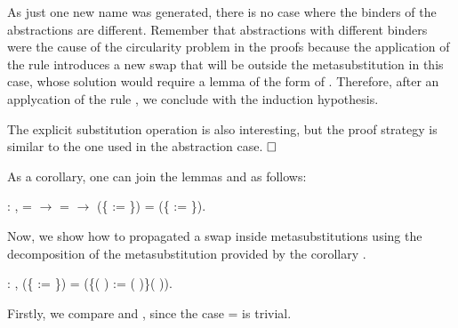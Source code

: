 As just one new name was generated, there is no case where the binders of the abstractions are different. Remember that abstractions with different binders were the cause of the circularity problem in the proofs because the application of the rule  introduces a new swap that will be outside the metasubstitution in this case, whose solution would require a lemma of the form of . Therefore, after an applycation of the rule , we conclude with the induction hypothesis.
\begin{coqdoccode}
\end{coqdoccode}
The explicit substitution operation is also interesting, but the proof strategy is similar to the one used in the abstraction case. $\hfill\Box$
\begin{coqdoccode}
\coqdocemptyline
\end{coqdoccode}
As a corollary, one can join the lemmas  and  as follows:
\begin{coqdoccode}
\coqdocemptyline
\coqdocnoindent
{} : \coqdockw{\ensuremath{\forall}}     ,  =  \ensuremath{\rightarrow}  =  \ensuremath{\rightarrow} (\{ := \}) = (\{ := \}).\coqdoceol
\coqdocemptyline
\end{coqdoccode}
Now, we show how to propagated a swap inside metasubstitutions using the decomposition of the metasubstitution provided by the corollary .\newline 
\begin{coqdoccode}
\coqdocemptyline
\coqdocnoindent
{} : \coqdockw{\ensuremath{\forall}}     ,    (\{ := \}) = (\{(   ) := (   )\}(   )).\coqdoceol
\end{coqdoccode}
 Firstly, we compare  and , since the case  =  is trivial.
